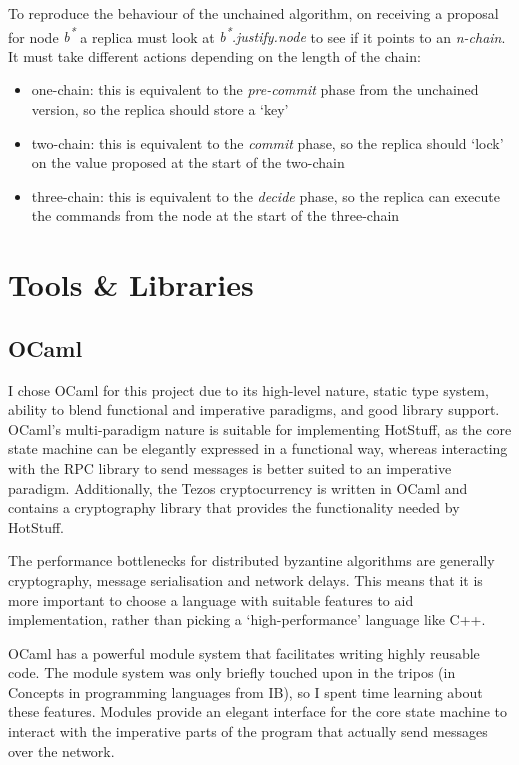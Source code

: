 To reproduce the behaviour of the unchained algorithm, on receiving a proposal for node \textit{b\textsuperscript{*}} a replica must look at \textit{b\textsuperscript{*}.justify.node} to see if it points to an \textit{n-chain}. It must take different actions depending on the length of the chain:

\begin{itemize}
\item one-chain: this is equivalent to the \textit{pre-commit} phase from the unchained version, so the replica should store a `key'
\item two-chain: this is equivalent to the \textit{commit} phase, so the replica should `lock' on the value proposed at the start of the two-chain
\item three-chain: this is equivalent to the \textit{decide} phase, so the replica can execute the commands from the node at the start of the three-chain
\end{itemize}

\section{Tools \& Libraries}
\subsection{OCaml}
I chose OCaml for this project due to its high-level nature, static type system, ability to blend functional and imperative paradigms, and good library support. OCaml's multi-paradigm nature is suitable for implementing HotStuff, as the core state machine can be elegantly expressed in a functional way, whereas interacting with the RPC library to send messages is better suited to an imperative paradigm. Additionally, the Tezos cryptocurrency is written in OCaml and contains a cryptography library that provides the functionality needed by HotStuff.

The performance bottlenecks for distributed byzantine algorithms are generally cryptography, message serialisation and network delays. This means that it is more important to choose a language with suitable features to aid implementation, rather than picking a `high-performance' language like C++.

OCaml has a powerful module system that facilitates writing highly reusable code. The module system was only briefly touched upon in the tripos (in Concepts in programming languages from IB), so I spent time learning about these features. Modules provide an elegant interface for the core state machine to interact with the imperative parts of the program that actually send messages over the network.

